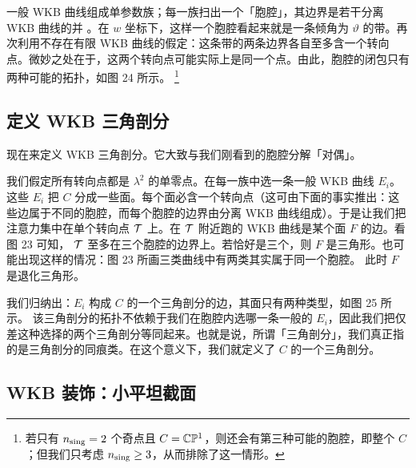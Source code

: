 一般 WKB 曲线组成单参数族；每一族扫出一个「胞腔」，其边界是若干分离 WKB 曲线的并 \cite{MR743423}。在 $w$ 坐标下，这样一个胞腔看起来就是一条倾角为 $\vartheta$ 的带。再次利用不存在有限 WKB 曲线的假定：这条带的两条边界各自至多含一个转向点。微妙之处在于，这两个转向点可能实际上是同一个点。由此，胞腔的闭包只有两种可能的拓扑，如图 24 所示。%
\footnote{若只有 $n_{\rm sing}=2$ 个奇点且 $C = \mathbb{C}\mathbb{P}^1$，则还会有第三种可能的胞腔，即整个 $C$；但我们只考虑 $n_{\rm sing} \ge 3$，从而排除了这一情形。}


\subsection{定义 WKB 三角剖分}\label{subsec:DefiningWKB-Triang}

现在来定义 WKB 三角剖分。它大致与我们刚看到的胞腔分解「对偶」。

我们假定所有转向点都是 $\lambda^2$ 的单零点。在每一族中选一条一般 WKB 曲线 $E_i$。这些 $E_i$ 把 $C$ 分成一些面。每个面必含一个转向点（这可由下面的事实推出：这些边属于不同的胞腔，而每个胞腔的边界由分离 WKB 曲线组成）。于是让我们把注意力集中在单个转向点 $\mathcal{T}$ 上。在 $\mathcal{T}$ 附近跑的 WKB 曲线是某个面 $F$ 的边。看图 23 可知，%
$\mathcal{T}$ 至多在三个胞腔的边界上。若恰好是三个，则 $F$ 是三角形。也可能出现这样的情况：图 23 所画三类曲线中有两类其实属于同一个胞腔。%
此时 $F$ 是退化三角形。


我们归纳出：$E_i$ 构成 $C$ 的一个三角剖分的边，其面只有两种类型，如图 25 所示。%
该三角剖分的拓扑不依赖于我们在胞腔内选哪一条一般的 $E_i$，因此我们把仅差这种选择的两个三角剖分等同起来。也就是说，所谓「三角剖分」，我们真正指的是三角剖分的同痕类。在这个意义下，我们就定义了 $C$ 的一个三角剖分。

\subsection{WKB 装饰：小平坦截面} \label{sec:small-flat}

